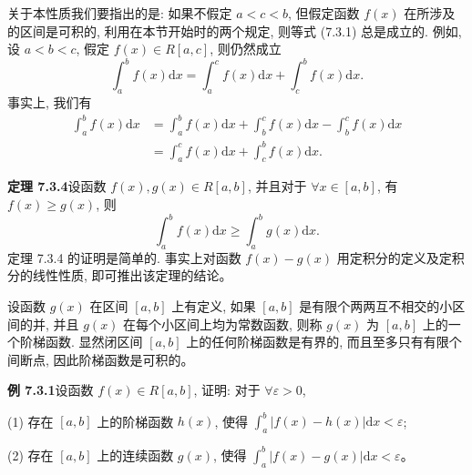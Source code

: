 \documentclass[UTF8,12pt,a4paper,fontset=fandol]{ctexart}
\begin{document}
关于本性质我们要指出的是: 如果不假定 $a<c<b$, 但假定函数 $f(x)$ 在所涉及的区间是可积的, 利用在本节开始时的两个规定, 则等式 (7.3.1) 总是成立的. 例如, 设 $a<b<c$, 假定 $f(x)\in R[a,c]$, 则仍然成立
\[
  \int_a^b f(x)\mathrm dx=\int_a^c f(x)\mathrm dx+\int_c^b f(x)\mathrm dx.
\]
事实上, 我们有
\[
\begin{aligned}
  \int_a^b f(x)\mathrm dx
  &=\int_a^b f(x)\mathrm dx+\int_b^c f(x)\mathrm dx-\int_b^c f(x)\mathrm dx\\
  &=\int_a^c f(x)\mathrm dx+\int_c^b f(x)\mathrm dx.
\end{aligned}
\]

\noindent\textbf{定理 7.3.4}\quad 设函数 $f(x),g(x)\in R[a,b]$, 并且对于 $\forall x\in[a,b]$, 有 $f(x)\geq g(x)$, 则
\[
  \int_a^b f(x)\mathrm dx\geq \int_a^b g(x)\mathrm dx.
\]
定理 7.3.4 的证明是简单的. 事实上对函数 $f(x)-g(x)$ 用定积分的定义及定积分的线性性质, 即可推出该定理的结论。

设函数 $g(x)$ 在区间 $[a,b]$ 上有定义, 如果 $[a,b]$ 是有限个两两互不相交的小区间的并, 并且 $g(x)$ 在每个小区间上均为常数函数, 则称 $g(x)$ 为 $[a,b]$ 上的一个阶梯函数. 显然闭区间 $[a,b]$ 上的任何阶梯函数是有界的, 而且至多只有有限个间断点, 因此阶梯函数是可积的。

\noindent\textbf{例 7.3.1}\quad 设函数 $f(x)\in R[a,b]$, 证明: 对于 $\forall\varepsilon>0$,

(1) 存在 $[a,b]$ 上的阶梯函数 $h(x)$, 使得 $\int_a^b |f(x)-h(x)|\mathrm dx<\varepsilon$;

(2) 存在 $[a,b]$ 上的连续函数 $g(x)$, 使得 $\int_a^b |f(x)-g(x)|\mathrm dx<\varepsilon$。
\end{document}
